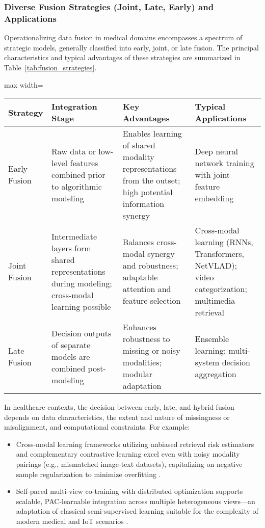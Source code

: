 \documentclass[sigconf]{acmart}
\begin{document}
\subsubsection{Diverse Fusion Strategies (Joint, Late, Early) and Applications}

Operationalizing data fusion in medical domains encompasses a spectrum of strategic models, generally classified into early, joint, or late fusion. The principal characteristics and typical advantages of these strategies are summarized in Table~\ref{tab:fusion_strategies}.

\begin{table*}[htbp]
\centering
\caption{Comparison of Fusion Strategies in Multimodal Medical Analytics}
\label{tab:fusion_strategies}
\begin{adjustbox}{max width=\textwidth}
\begin{tabular}{llll}
\toprule
\textbf{Strategy} & \textbf{Integration Stage} & \textbf{Key Advantages} & \textbf{Typical Applications} \\
\midrule
Early Fusion & Raw data or low-level features combined prior to algorithmic modeling & Enables learning of shared modality representations from the outset; high potential information synergy & Deep neural network training with joint feature embedding \\
Joint Fusion & Intermediate layers form shared representations during modeling; cross-modal learning possible & Balances cross-modal synergy and robustness; adaptable attention and feature selection & Cross-modal learning (RNNs, Transformers, NetVLAD); video categorization; multimedia retrieval \\
Late Fusion & Decision outputs of separate models are combined post-modeling & Enhances robustness to missing or noisy modalities; modular adaptation & Ensemble learning; multi-system decision aggregation \\
\bottomrule
\end{tabular}
\end{adjustbox}
\end{table*}

In healthcare contexts, the decision between early, late, and hybrid fusion depends on data characteristics, the extent and nature of missingness or misalignment, and computational constraints. For example:
\begin{itemize}
    \item Cross-modal learning frameworks utilizing unbiased retrieval risk estimators and complementary contrastive learning excel even with noisy modality pairings (e.g., mismatched image-text datasets), capitalizing on negative sample regularization to minimize overfitting \cite{ref64,ref61}.
    \item Self-paced multi-view co-training with distributed optimization supports scalable, PAC-learnable integration across multiple heterogeneous views—an adaptation of classical semi-supervised learning suitable for the complexity of modern medical and IoT scenarios \cite{ref54,ref60,ref62}.
\end{itemize}
\end{document}
